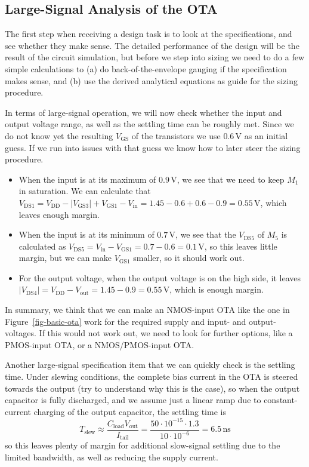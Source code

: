 \documentclass[
  a4paper,
  DIV=11,
  numbers=noendperiod]{scrartcl}
\providecommand{\tightlist}{%
  \setlength{\itemsep}{0pt}\setlength{\parskip}{0pt}}\usepackage{longtable,booktabs,array}
\begin{document}
\subsection{Large-Signal Analysis of the
OTA}\label{sec-basic-ota-large-signal}

The first step when receiving a design task is to look at the
specifications, and see whether they make sense. The detailed
performance of the design will be the result of the circuit simulation,
but before we step into sizing we need to do a few simple calculations
to (a) do back-of-the-envelope gauging if the specification makes sense,
and (b) use the derived analytical equations as guide for the sizing
procedure.

In terms of large-signal operation, we will now check whether the input
and output voltage range, as well as the settling time can be roughly
met. Since we do not know yet the resulting \(V_\mathrm{GS}\) of the
transistors we use \(0.6\,\text{V}\) as an initial guess. If we run into
issues with that guess we know how to later steer the sizing procedure.

\begin{itemize}
\tightlist
\item
  When the input is at its maximum of \(0.9\,\text{V}\), we see that we
  need to keep \(M_1\) in saturation. We can calculate that
  \(V_\mathrm{DS1} = V_\mathrm{DD}- |V_\mathrm{GS3}| + V_\mathrm{GS1} - V_\mathrm{in} = 1.45 - 0.6 + 0.6 - 0.9 = 0.55\,\text{V}\),
  which leaves enough margin.
\item
  When the input is at its minimum of \(0.7\,\text{V}\), we see that the
  \(V_\mathrm{DS5}\) of \(M_5\) is calculated as
  \(V_\mathrm{DS5} = V_\mathrm{in} - V_\mathrm{GS1} = 0.7 - 0.6 = 0.1\,\text{V}\),
  so this leaves little margin, but we can make \(V_\mathrm{GS1}\)
  smaller, so it should work out.
\item
  For the output voltage, when the output voltage is on the high side,
  it leaves
  \(|V_\mathrm{DS4}| = V_\mathrm{DD}- V_\mathrm{out} = 1.45 - 0.9 = 0.55\,\text{V}\),
  which is enough margin.
\end{itemize}

In summary, we think that we can make an NMOS-input OTA like the one in
Figure~\ref{fig-basic-ota} work for the required supply and input- and
output-voltages. If this would not work out, we need to look for further
options, like a PMOS-input OTA, or a NMOS/PMOS-input OTA.

Another large-signal specification item that we can quickly check is the
settling time. Under slewing conditions, the complete bias current in
the OTA is steered towards the output (try to understand why this is the
case), so when the output capacitor is fully discharged, and we assume
just a linear ramp due to constant-current charging of the output
capacitor, the settling time is \[
T_\mathrm{slew} \approx \frac{C_\mathrm{load} V_\mathrm{out}}{I_\mathrm{tail}} = \frac{50 \cdot 10^{-15} \cdot 1.3}{10 \cdot 10^{-6}} = 6.5\,\text{ns}
\] so this leaves plenty of margin for additional slow-signal settling
due to the limited bandwidth, as well as reducing the supply current.
\end{document}
